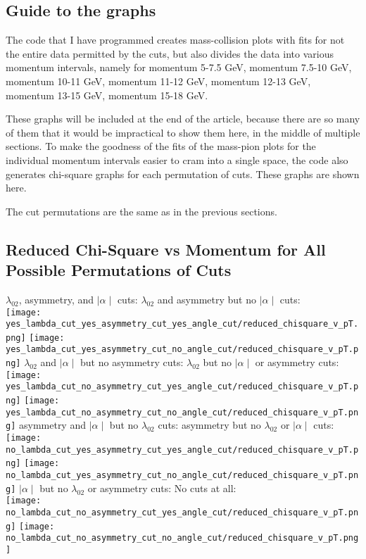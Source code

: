 \documentclass[11pt]{article}
\begin{document}
\subsection{Guide to the graphs} %
The code that I have programmed creates mass-collision plots with fits for not the entire data permitted by the cuts, but also divides the data into various momentum intervals, namely for momentum 5-7.5 GeV, momentum 7.5-10 GeV, momentum 10-11 GeV, momentum 11-12 GeV, momentum 12-13 GeV, momentum 13-15 GeV, momentum 15-18 GeV.

These graphs will be included at the end of the article, because there are so many of them that it would be impractical  to show them here, in the middle of multiple sections. To make the goodness of the fits of the mass-pion plots for the individual momentum intervals easier to cram into a single space, the code also generates chi-square graphs for each permutation of cuts. These graphs are shown here.

The cut permutations are the same as in the previous sections.

\subsection{Reduced Chi-Square vs Momentum for All Possible Permutations of Cuts} %
$\lambda_{02}$, asymmetry, and $\mid\alpha\mid$ cuts:
\noindent\hspace{1 cm}$\lambda_{02}$ and asymmetry but no $\mid\alpha\mid$ cuts:\\
\texttt{[image: yes\_lambda\_cut\_yes\_asymmetry\_cut\_yes\_angle\_cut/reduced\_chisquare\_v\_pT.png]}
\texttt{[image: yes\_lambda\_cut\_yes\_asymmetry\_cut\_no\_angle\_cut/reduced\_chisquare\_v\_pT.png]}
$\lambda_{02}$ and $\mid\alpha\mid$ but no asymmetry cuts:
\noindent\hspace{1 cm}$\lambda_{02}$ but no $\mid\alpha\mid$ or asymmetry cuts:\\
\texttt{[image: yes\_lambda\_cut\_no\_asymmetry\_cut\_yes\_angle\_cut/reduced\_chisquare\_v\_pT.png]}
\texttt{[image: yes\_lambda\_cut\_no\_asymmetry\_cut\_no\_angle\_cut/reduced\_chisquare\_v\_pT.png]}
asymmetry and $\mid\alpha\mid$ but no $\lambda_{02}$ cuts:
\noindent\hspace{1 cm}asymmetry but no $\lambda_{02}$ or $\mid\alpha\mid$ cuts:\\
\texttt{[image: no\_lambda\_cut\_yes\_asymmetry\_cut\_yes\_angle\_cut/reduced\_chisquare\_v\_pT.png]}
\texttt{[image: no\_lambda\_cut\_yes\_asymmetry\_cut\_no\_angle\_cut/reduced\_chisquare\_v\_pT.png]}
$\mid\alpha\mid$ but no $\lambda_{02}$ or asymmetry cuts:
\noindent\hspace{1 cm} No cuts at all:\\
\texttt{[image: no\_lambda\_cut\_no\_asymmetry\_cut\_yes\_angle\_cut/reduced\_chisquare\_v\_pT.png]}
\texttt{[image: no\_lambda\_cut\_no\_asymmetry\_cut\_no\_angle\_cut/reduced\_chisquare\_v\_pT.png]}
\end{document}
